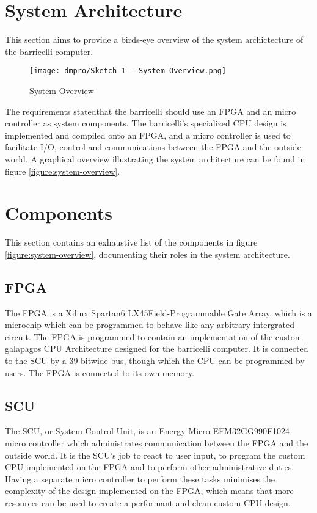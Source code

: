 \section{System Architecture}

This section aims to provide a birds-eye overview of the system archictecture of the \Gls{barricelli} computer.

\begin{figure}[H]
\texttt{[image: dmpro/Sketch 1 - System Overview.png]}
\caption{System Overview}
\label{figure:system-overview}
\end{figure}

The requirements stated\cn that the \Gls{barricelli} should use an FPGA and an micro controller as system components.
The \Gls{barricelli}'s specialized CPU design is implemented and compiled onto an FPGA, and a micro controller is used to facilitate I/O, control and communications between the FPGA and the outside world.
A graphical overview illustrating the system architecture can be found in figure \vref{figure:system-overview}.

\section{Components}

This section contains an exhaustive list of the components in figure \vref{figure:system-overview}, documenting their roles in the system architecture.

\subsection{FPGA}

The FPGA is a Xilinx Spartan6 LX45\cn Field-Programmable Gate Array, which is a microchip which can be programmed to behave like any arbitrary intergrated circuit.
The FPGA is programmed to contain an implementation of the custom \Gls{galapagos} CPU Architecture designed for the \Gls{barricelli} computer.
It is connected to the SCU by a 39-bit\cn wide bus, though which the CPU can be programmed by users.
The FPGA is connected to its own memory.

\subsection{SCU}

The SCU, or System Control Unit, is an Energy Micro EFM32GG990F1024 micro controller which administrates communication between the FPGA and the outside world.
It is the SCU's job to react to user input, to program the custom CPU implemented on the FPGA and to perform other administrative duties.
Having a separate micro controller to perform these tasks minimises the complexity of the design implemented on the FPGA, which means that more resources can be used to create a performant and clean custom CPU design.

